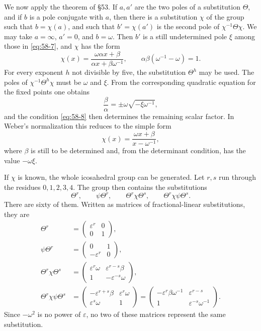 \documentclass[11pt,a4paper]{book}
\newcommand{\eps}{\varepsilon}
\begin{document}
We now apply the theorem of \S 53.  If \(a,a'\) are the two poles of a substitution \(\Theta\), and if \(b\) is a pole conjugate with \(a\), then there is a substitution \(\chi\) of the group such that \(b=\chi(a)\), and such that \(b'=\chi(a')\) is the second pole of \(\chi^{-1}\Theta\chi\).  We may take \(a=\infty\), \(a'=0\), and \(b=\omega\).  Then \(b'\) is a still undetermined pole \(\xi\) among those in \eqref{eq:58-7}, and \(\chi\) has the form
\begin{equation}\label{eq:58-8}
 \chi(x)=\frac{\omega\alpha x+\beta}{\alpha x+\beta\omega^{-1}},
 \qquad \alpha\beta(\omega^{-1}-\omega)=1.
\end{equation}
For every exponent \(h\) not divisible by five, the substitution \(\Theta^h\) may be used.  The poles of \(\chi^{-1}\Theta^h\chi\) must be \(\omega\) and \(\xi\).  From the corresponding quadratic equation for the fixed points one obtains
\[
 \frac{\beta}{\alpha}=\pm\omega\sqrt{-\xi\omega^{-1}},
\]
and the condition \eqref{eq:58-8} then determines the remaining scalar factor.  In Weber's normalization this reduces to the simple form
\begin{equation}\label{eq:58-9}
 \chi(x)=\frac{\omega x+\beta}{x-\omega^{-1}},
\end{equation}
where \(\beta\) is still to be determined and, from the determinant condition, has the value \(-\omega\xi\).

If \(\chi\) is known, the whole icosahedral group can be generated.  Let \(r,s\) run through the residues \(0,1,2,3,4\).  The group then contains the substitutions
\begin{equation}\label{eq:58-10}
 \Theta^r,
 \qquad \psi\Theta^r,
 \qquad \Theta^r\chi\Theta^s,
 \qquad \Theta^r\chi\psi\Theta^s.
\end{equation}
There are sixty of them.  Written as matrices of fractional-linear substitutions, they are
\begin{align}
 \Theta^r&=\begin{pmatrix}\eps^r&0\\0&1\end{pmatrix},\label{eq:58-11}\\
 \psi\Theta^r&=\begin{pmatrix}0&1\\-\eps^r&0\end{pmatrix},\label{eq:58-12}\\
 \Theta^r\chi\Theta^s
 &=\begin{pmatrix}\eps^r\omega&\eps^{r-s}\beta\\1&-\eps^{-s}\omega\end{pmatrix},\label{eq:58-13}\\
 \Theta^r\chi\psi\Theta^s
 &=\begin{pmatrix}-\eps^{r+s}\beta&\eps^r\omega\\ \eps^s\omega&1\end{pmatrix}
  =\begin{pmatrix}-\eps^r\beta\omega^{-1}&\eps^{r-s}\\1&\eps^{-s}\omega^{-1}\end{pmatrix}.
  \label{eq:58-14}
\end{align}
Since \(-\omega^2\) is no power of \(\eps\), no two of these matrices represent the same substitution.
\end{document}
